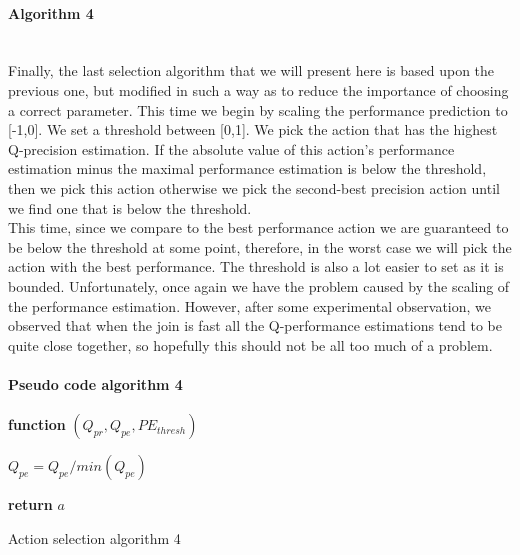 \paragraph{Algorithm 4}\mbox{}\\
Finally, the last selection algorithm that we will present here is based upon the previous one, but modified in such a way as to reduce the importance of choosing a correct parameter. This time we begin by scaling the performance prediction to [-1,0]. We set a threshold between [0,1]. We pick the action that has the highest Q-precision estimation. If the absolute value of this action's performance estimation minus the maximal performance estimation is below the threshold, then we pick this action otherwise we pick the second-best precision action until we find one that is below the threshold.\\
This time, since we compare to the best performance action we are guaranteed to be below the threshold at some point, therefore, in the worst case we will pick the action with the best performance. The threshold is also a lot easier to set as it is bounded. Unfortunately, once again we have the problem caused by the scaling of the performance estimation. However, after some experimental observation, we observed that when the join is fast all the Q-performance estimations tend to be quite close together, so hopefully this should not be all too much of a problem.
\paragraph{Pseudo code algorithm 4}
\begin{center}
	\begin{algorithm}[H]

    \textbf{function}  $(Q_{pr},Q_{pe},PE_{thresh})$\;
    
    
    \Indp{}\Indm
    \Indp{} \Indm
    \Indp
    $Q_{pe} = Q_{pe}/min(Q_{pe})$\\
   
  
   \textbf{return} $a$
   
    
\caption{Action selection algorithm 4}
\end{algorithm}
\end{center}
